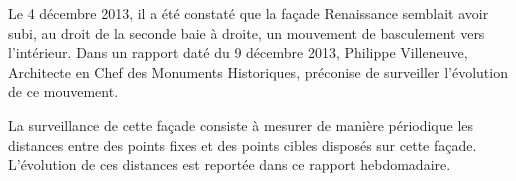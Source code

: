 
Le 4 décembre 2013, il a été constaté que la façade Renaissance semblait avoir subi, 
au droit de la seconde baie à droite, un mouvement de basculement vers l'intérieur.
Dans un rapport daté du 9 décembre 2013, Philippe Villeneuve, Architecte en Chef des 
Monuments Historiques, préconise de surveiller l'évolution de ce mouvement.

La surveillance de cette façade consiste à mesurer de manière périodique les distances 
entre des points fixes et des points cibles disposés sur cette façade.
L'évolution de ces distances est reportée dans ce rapport hebdomadaire.
